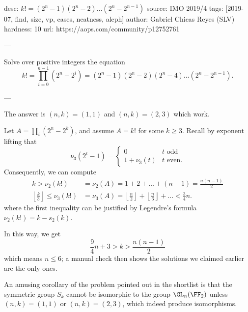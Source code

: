 desc: $k! = (2^n-1)(2^n-2)\dots (2^n-2^{n-1})$
source: IMO 2019/4
tags: [2019-07, find, size, vp, cases, neatness, aleph]
author: Gabriel Chicas Reyes (SLV)
hardness: 10
url: https://aops.com/community/p12752761

---

Solve over positive integers the equation
\[ k! = \prod_{i=0}^{n-1} (2^n-2^i)
  = (2^n-1)(2^n-2)(2^n-4) \dots (2^n-2^{n-1}). \]

---

The answer is $(n,k) =(1,1)$ and $(n,k) = (2,3)$ which work.

Let $A = \prod_i (2^n-2^k)$, and assume $A = k!$ for some $k \ge 3$.
Recall by exponent lifting that
\[ \nu_3(2^t-1) = \begin{cases}
    0 & t \text{ odd} \\
    1 + \nu_3(t) & t \text{ even}.
  \end{cases} \]
Consequently, we can compute
\begin{align*}
  k > \nu_2(k!) &= \nu_2(A) = 1 + 2 + \dots + (n-1) = \frac{n(n-1)}{2} \\
  \left\lfloor \frac k3 \right\rfloor
    \le \nu_3(k!) &= \nu_3(A) = \left\lfloor \frac n2 \right\rfloor
    + \left\lfloor \frac n6 \right\rfloor + \dots < \frac 34n.
\end{align*}
where the first inequality can be justified
by Legendre's formula $\nu_2(k!) = k - s_2(k)$.

In this way, we get
\[ \frac 94 n + 3 > k > \frac{n(n-1)}{2} \]
which means $n \le 6$; a manual check then shows the
solutions we claimed earlier are the only ones.

\begin{remark*}
  An amusing corollary of the problem pointed out in the shortlist
  is that the symmetric group $S_k$ cannot be isomorphic to the group $\GL_n(\FF_2)$
  unless $(n,k) = (1,1)$ or $(n,k) = (2,3)$, which indeed produce isomorphisms.
\end{remark*}
